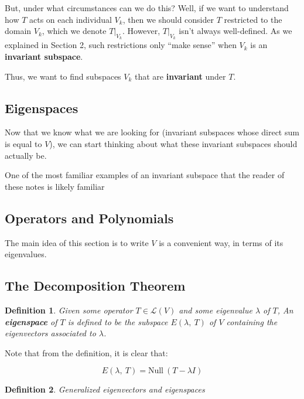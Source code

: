 \documentclass[10pt, oneside]{article}
\newtheorem{defn}{Definition}
\begin{document}
    But, under what circumstances can we do this? Well, if we want to understand how $T$ acts on
    each individual $V_k$, then we should consider $T$ restricted to the domain $V_k$, which we denote $T|_{V_k}$.
    However, $T|_{V_k}$ isn't always well-defined. As we explained in Section 2, such restrictions only
    ``make sense'' when $V_k$ is an \textbf{invariant subspace}.
    \newline

    Thus, we want to find subspaces $V_k$ that are \textbf{invariant} under $T$.

    \subsection{Eigenspaces}

    Now that we know what we are looking for (invariant subspaces whose direct sum is equal to $V$), we
    can start thinking about what these invariant subspaces should actually be.

    One of the most familiar examples of an invariant subspace that the reader of these notes is likely familiar 


    \subsection{Operators and Polynomials}

    The main idea of this section is to write $V$ is a convenient way, in terms of its eigenvalues.
    \newline



   \subsection{The Decomposition Theorem}

   \begin{defn}
     Given some operator $T \in \mathcal{L}(V)$ and some eigenvalue $\lambda$ of $T$,
     An \textbf{eigenspace} of $T$ is defined to be the
     subspace $E(\lambda, \ T)$ of $V$ containing the eigenvectors associated to $\lambda$.
   \end{defn}

   Note that from the definition, it is clear that:

   $$E(\lambda, \ T) = \text{Null} \ (T - \lambda I)$$

   \begin{defn}
     Generalized eigenvectors and eigenspaces
   \end{defn}
\end{document}
